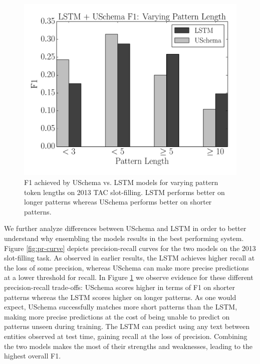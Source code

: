 \begin{figure}[t!]
\begin{center}
\includegraphics[scale=0.45]{f1-vary-pat-length}
\caption{F1 achieved by USchema vs. LSTM models for varying pattern token lengths on 2013 TAC slot-filling. LSTM performs better on longer patterns whereas USchema performs better on shorter patterns. \label{fig:f1-vary-pats}}
\end{center}
\vspace{-.5cm}
\end{figure}

We further analyze differences between USchema and LSTM in order to better understand why ensembling the models results in the best performing system. Figure \ref{fig:pr-curve} depicts precision-recall curves for the two models on the 2013 slot-filling task. As observed in earlier results, the LSTM achieves higher recall at the loss of some precision, whereas USchema can make more precise predictions at a lower threshold for recall. In Figure \ref{fig:f1-vary-pats} we observe evidence for these different precision-recall trade-offs: USchema scores higher in terms of F1 on shorter patterns whereas the LSTM scores higher on longer patterns. As one would expect, USchema successfully matches more short patterns than the LSTM, making more precise predictions at the cost of being unable to predict on patterns unseen during training. The LSTM can predict using any text between entities observed at test time, gaining recall at the loss of precision. Combining the two models makes the most of their strengths and weaknesses, leading to the highest overall F1.



